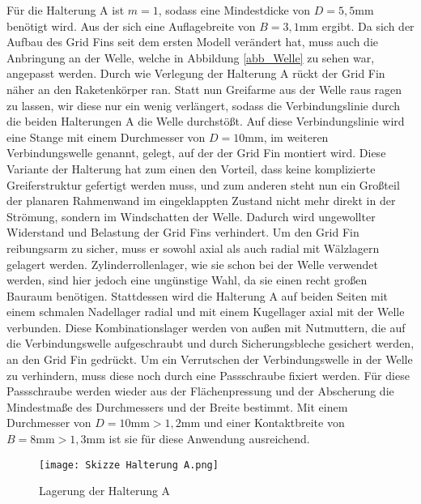 Für die Halterung A ist $m=1$, sodass eine Mindestdicke von $D=5,5$mm benötigt wird. Aus der sich eine Auflagebreite von $B = 3,1$mm ergibt. Da sich der Aufbau des Grid Fins seit dem ersten Modell verändert hat, muss auch die Anbringung an der Welle, welche in Abbildung \ref{abb_Welle} zu sehen war, angepasst werden. Durch wie Verlegung der Halterung A rückt der Grid Fin näher an den Raketenkörper ran. Statt nun Greifarme aus der Welle raus ragen zu lassen, wir diese nur ein wenig verlängert, sodass die Verbindungslinie durch die beiden Halterungen A die Welle durchstößt. Auf diese Verbindungslinie wird eine Stange mit einem Durchmesser von $D = 10$mm, im weiteren Verbindungswelle genannt, gelegt, auf der der Grid Fin montiert wird. Diese Variante der Halterung hat zum einen den Vorteil, dass keine komplizierte Greiferstruktur gefertigt werden muss, und zum anderen steht nun ein Großteil der planaren Rahmenwand im eingeklappten Zustand nicht mehr direkt in der Strömung, sondern im Windschatten der Welle. Dadurch wird ungewollter Widerstand und Belastung der Grid Fins verhindert. Um den Grid Fin reibungsarm zu sicher, muss er sowohl axial als auch radial mit Wälzlagern gelagert werden. Zylinderrollenlager, wie sie schon bei der Welle verwendet werden, sind hier jedoch eine ungünstige Wahl, da sie einen recht großen Bauraum benötigen. Stattdessen wird die Halterung A auf beiden Seiten mit einem schmalen Nadellager radial und mit einem Kugellager axial mit der Welle verbunden. Diese Kombinationslager werden von außen mit Nutmuttern, die auf die Verbindungswelle aufgeschraubt und durch Sicherungsbleche gesichert werden, an den Grid Fin gedrückt. Um ein Verrutschen der Verbindungswelle in der Welle zu verhindern, muss diese noch durch eine Passschraube fixiert werden. Für diese Passschraube werden wieder aus der Flächenpressung und der Abscherung die Mindestmaße des Durchmessers und der Breite bestimmt. Mit einem Durchmesser von $D = 10\mathrm{mm}> 1,2$mm und einer Kontaktbreite von $B = 8\mathrm{mm}> 1,3$mm ist sie für diese Anwendung ausreichend.
\begin{figure}[h] 
	\centering
	\texttt{[image: Skizze Halterung A.png]}
	\caption{Lagerung der Halterung A}
\end{figure}\\
